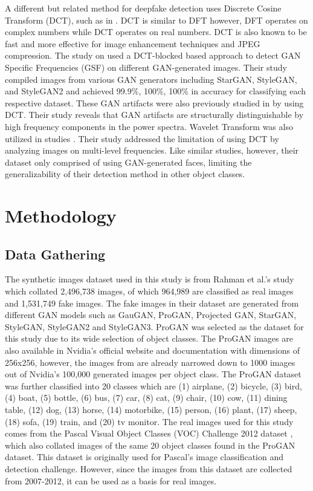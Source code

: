 \documentclass[journal]{./IEEE/IEEEtran}
\begin{document}
A different but related method for deepfake detection uses Discrete Cosine Transform (DCT), such as in \cite{dct-patchlevel, fighting-dct, lev-freq-dct}. DCT is similar to DFT however, DFT operates on complex numbers while DCT operates on real numbers. DCT is also known to be fast and more effective for image enhancement techniques \cite{dct-review} and JPEG compression. The study on \cite{fighting-dct} used a DCT-blocked based approach to detect GAN Specific Frequencies (GSF) on different GAN-generated images. Their study compiled images from various GAN generators including StarGAN, StyleGAN, and StyleGAN2 and achieved 99.9\%, 100\%, 100\% in accuracy for classifying each respective dataset. These GAN artifacts were also previously studied in \cite{lev-freq-dct} by using DCT. Their study reveals that GAN artifacts are structurally distinguishable by high frequency components in the power spectra. Wavelet Transform was also utilized in studies \cite{dwt,dwt2}. Their study addressed the limitation of using DCT by analyzing images on multi-level frequencies. Like similar studies, however, their dataset only comprised of using GAN-generated faces, limiting the generalizability of their detection method in other object classes.



\section{Methodology}

\subsection{Data Gathering}
The synthetic images dataset used in this study is from Rahman et al.'s study \cite{artifact-dataset} which collated 2,496,738 images, of which 964,989 are classified as real images and 1,531,749 fake images. The fake images in their dataset are generated from different GAN models such as GauGAN, ProGAN, Projected GAN, StarGAN, StyleGAN, StyleGAN2 and StyleGAN3. ProGAN was selected as the dataset for this study due to its wide selection of object classes. The ProGAN images are also available in Nvidia's official website and documentation \cite{progan-nvidia} with dimensions of 256x256, however, the images from \cite{artifact-dataset} are already narrowed down to 1000 images out of Nvidia's 100,000 generated images per object class. The ProGAN dataset was further classified into 20 classes which are (1) airplane, (2) bicycle, (3) bird, (4) boat, (5) bottle, (6) bus, (7) car, (8) cat, (9) chair, (10) cow, (11) dining table, (12) dog, (13) horse, (14) motorbike, (15) person, (16) plant, (17) sheep, (18) sofa, (19) train, and (20) tv monitor. The real images used for this study comes from the Pascal Visual Object Classes (VOC) Challenge 2012 dataset \cite{pascal-voc-2012}, which also collated images of the same 20 object classes found in the ProGAN dataset. This dataset is originally used for Pascal's image classification and detection challenge. However, since the images from this dataset are collected from 2007-2012, it can be used as a basis for real images. 
\end{document}
